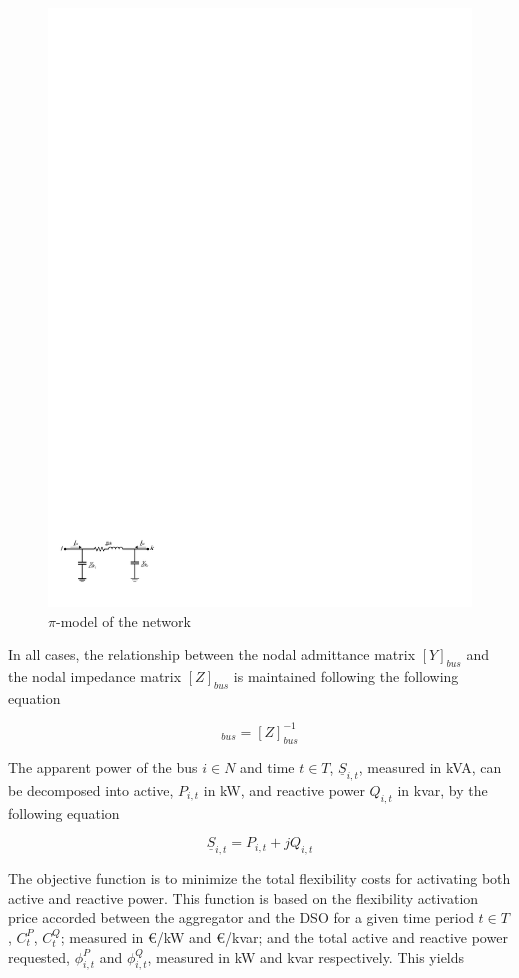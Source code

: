 \begin{figure}[htbp]
	\centering
	\includegraphics[width=0.7\columnwidth ]{ChapterOPF_DSO/Figures/pimodel2.pdf}
		\caption{$\pi$-model of the network}
	\label{fig:pimodel}  
\end{figure}

In all cases, the relationship between the nodal admittance matrix  $[Y]_{bus}$ and the nodal impedance matrix  $[Z]_{bus}$ is maintained following the following equation 

\begin{equation*}
[Y]_{bus} = [Z]_{bus}^{-1}
\end{equation*}

The apparent power of the bus $i \in N$ and time $t \in T$, $\underline{S}_{i,t}$, measured in kVA, can be decomposed into active, $P_{i,t}$ in kW, and reactive power $Q_{i,t}$ in kvar, by the following equation 

\begin{equation*}
\underline{S}_{i,t} = P_{i,t} + jQ_{i,t}
\end{equation*}

The objective function is to minimize the total flexibility costs for activating both active and reactive power. This function is based on the flexibility activation price accorded between the aggregator and the DSO for a given time period $t \in T$, $C_t^{P}$, $C_t^{Q}$; measured in \euro/kW and \euro/kvar;  and the total active and reactive power requested, $\phi_{i,t}^{P}$ and $\phi_{i,t}^{Q}$, measured in kW and kvar respectively. This yields

